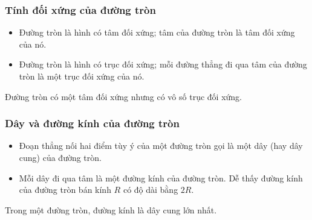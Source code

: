 \begin{tomtat}
\begin{nx}
\begin{itemize}
{
 }
\end{itemize}
\end{nx}
\begin{note}
\end{note}
\subsubsection{Tính đối xứng của đường tròn}
\begin{boxdn}
 \begin{itemize}
 \item Đường tròn là hình có tâm đối xứng; tâm của đường tròn là tâm đối xứng của nó.
 \item Đường tròn là hình có trục đối xứng; mỗi đường thẳng đi qua tâm của đường tròn là một trục đối xứng của nó.
 \end{itemize}
\end{boxdn}
\begin{note}
 Đường tròn có một tâm đối xứng nhưng có vô số trục đối xứng.
\end{note}
	\subsubsection{Dây và đường kính của đường tròn}
\begin{boxdn}
	\noindent
	\begin{itemize}
	\item	Đoạn thẳng nối hai điểm tùy ý của một đường tròn gọi là một dây (hay dây cung) của đường tròn.
	\item	Mỗi dây đi qua tâm là một đường kính của đường tròn. Dễ thấy đường kính của đường tròn bán kính $R$ có độ dài bằng $2R$.
	\end{itemize}	
\end{boxdn}
\begin{boxdl}
	Trong một đường tròn, đường kính là dây cung lớn nhất.
\end{boxdl}

\end{tomtat}
